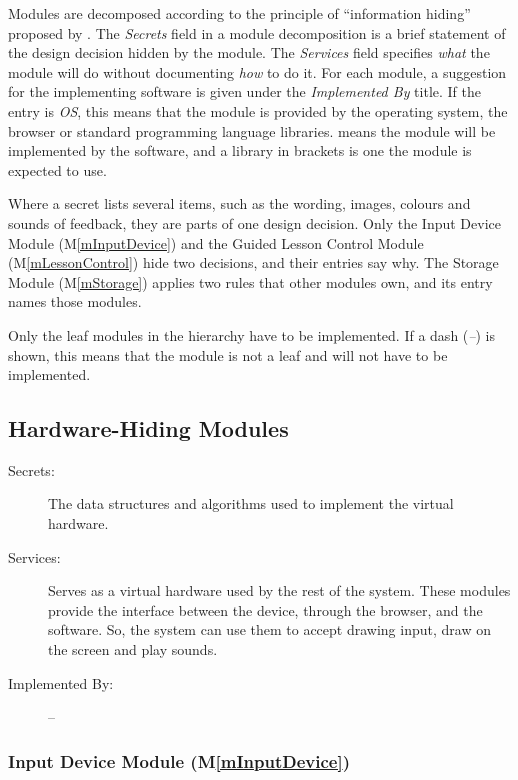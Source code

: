 \documentclass[12pt, titlepage]{article}
\newcommand{\mref}[1]{M\ref{#1}}
\begin{document}
Modules are decomposed according to the principle of ``information hiding''
proposed by \citet{ParnasEtAl1984}. The \emph{Secrets} field in a module
decomposition is a brief statement of the design decision hidden by the
module. The \emph{Services} field specifies \emph{what} the module will do
without documenting \emph{how} to do it. For each module, a suggestion for the
implementing software is given under the \emph{Implemented By} title. If the
entry is \emph{OS}, this means that the module is provided by the operating
system, the browser or standard programming language libraries.
\emph{\progname{}} means the module will be implemented by the \progname{}
software, and a library in brackets is one the module is expected to use.

Where a secret lists several items, such as the wording, images, colours and
sounds of feedback, they are parts of one design decision. Only the Input Device
Module (\mref{mInputDevice}) and the Guided Lesson Control Module
(\mref{mLessonControl}) hide two decisions, and their entries say why. The
Storage Module (\mref{mStorage}) applies two rules that other modules own, and
its entry names those modules.

Only the leaf modules in the hierarchy have to be implemented. If a dash
(\emph{--}) is shown, this means that the module is not a leaf and will not have
to be implemented.

\subsection{Hardware-Hiding Modules}

\begin{description}
\item[Secrets:] The data structures and algorithms used to implement the
  virtual hardware.
\item[Services:] Serves as a virtual hardware used by the rest of the system.
  These modules provide the interface between the device, through the browser,
  and the software. So, the system can use them to accept drawing input, draw on
  the screen and play sounds.
\item[Implemented By:] --
\end{description}

\subsubsection{Input Device Module (\mref{mInputDevice})}
\end{document}
